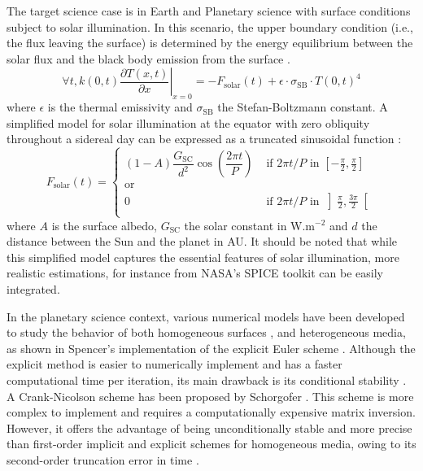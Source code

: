 \documentclass[sn-vancouver, Numbered]{sn-jnl}
\begin{document}
The target science case is in Earth and Planetary science with surface conditions subject to solar illumination. In this scenario, the upper boundary condition (i.e., the flux leaving the surface) is determined by the energy equilibrium between the solar flux and the black body emission from the surface \cite{Spencer1989}.
\begin{equation}
    \forall t, k(0,t) \left. \dfrac{\partial T(x, t)}{\partial x}\right|_{x=0} =  - F_{\mathrm{solar}}(t) + \epsilon \cdot \sigma_{\mathrm{SB}} \cdot T(0, t)^4
    \label{eq:energy-eq}
\end{equation}
where $\epsilon$ is the thermal emissivity and $\sigma_{\mathrm{SB}}$ the Stefan-Boltzmann constant.
A simplified model for solar illumination at the equator with zero obliquity throughout a sidereal day can be expressed as a truncated sinusoidal function \cite{Spencer1989} :
\begin{equation}
	F_{\mathrm{solar}}(t) = \left\{ 
		\begin{array}{ll}
			\left(1 - A \right) \dfrac{G_{\mathrm{SC}}}{d^2} \cos \left(\dfrac{2 \pi t}{P} \right) & \text{ if } {2 \pi t}/{P} \text{ in } \left[-\frac{\pi}{2}, \frac{\pi}{2}\right] \\ 
		\text{or} \\
		0   &  \text{ if }  {2 \pi t}/{P} \text{ in } \left]\frac{\pi}{2}, \frac{3\pi}{2}\right[ \\
		\end{array}
	\right.
\end{equation}
where $A$ is the surface albedo, $G_{\mathrm{SC}}$ the solar constant in W.m$^{-2}$ and $d$ the distance between the Sun and the planet in AU. 
It should be noted that while this simplified model captures the essential features of solar illumination, 
more realistic estimations, for instance from NASA's SPICE toolkit \cite{Acton1996, Acton2018} can be easily integrated.

In the planetary science context, various numerical models have been developed to study the behavior of both homogeneous surfaces \cite{Wesselink1948, Rozitis2011, Kieffer2013}, and heterogeneous media, as shown in Spencer's implementation of the explicit Euler scheme \cite{Spencer1989}. 
 Although the explicit method is easier to numerically implement and has a faster computational time per iteration, its main drawback is its conditional stability \cite{Press1992}.
A Crank-Nicolson scheme \cite{Crank1947} has been proposed by Schorgofer \cite{Schorghofer2010}. This scheme is more complex to implement and requires a computationally expensive matrix inversion. However, it offers the advantage of being unconditionally stable and more precise than first-order implicit and explicit schemes for homogeneous media, owing to its second-order truncation error in time \cite{Mazumder2016}.
 
\end{document}
